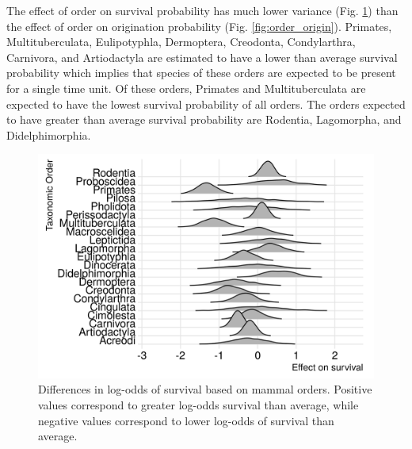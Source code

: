 \documentclass[12pt,letterpaper]{article}
\begin{document}
The effect of order on survival probability has much lower variance (Fig. \ref{fig:order_surv}) than the effect of order on origination probability (Fig. \ref{fig:order_origin}). Primates, Multituberculata, Eulipotyphla, Dermoptera, Creodonta, Condylarthra, Carnivora, and Artiodactyla are estimated to have a lower than average survival probability which implies that species of these orders are expected to be present for a single time unit. Of these orders, Primates and Multituberculata are expected to have the lowest survival probability of all orders. The orders expected to have greater than average survival probability are Rodentia, Lagomorpha, and Didelphimorphia.
\begin{figure}[ht]
  \centering
  \includegraphics[width=\textwidth,height=0.4\textheight,keepaspectratio=true]{figure/order_survival_bd}
  \caption{Differences in log-odds of survival based on mammal orders. Positive values correspond to greater log-odds survival than average, while negative values correspond to lower log-odds of survival than average.}
  \label{fig:order_surv}
\end{figure}
\end{document}
